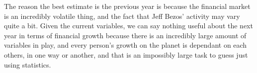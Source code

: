 The reason the best estimate is the previous year is because the financial market is an incredibly volatile thing, and the fact that Jeff Bezos' activity may vary quite a bit. Given the current variables, we can say nothing useful about the next year in terms of financial growth because there is an incredibly large amount of variables in play, and every person's growth on the planet is dependant on each others, in one way or another, and that is an impossibly large task to guess just using statistics.
